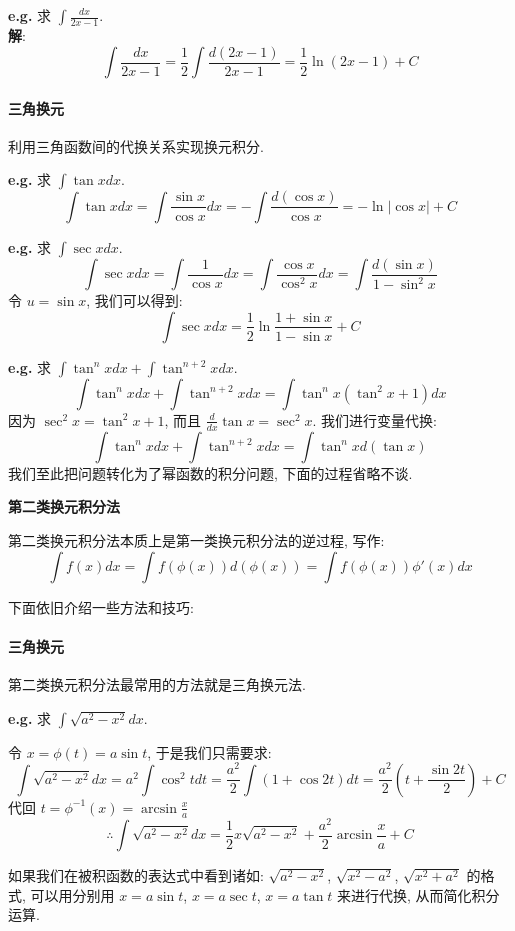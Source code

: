 \documentclass[a4paper,12pt]{ctexart}
\begin{document}
\noindent\textbf{e.g.} 求 $\int \frac{dx}{2x-1}$. \\
\textbf{解}:
$$
\int \frac{dx}{2x-1} = \frac{1}{2}\int \frac{d(2x-1)}{2x-1}=\frac{1}{2} \ln (2x-1) +C
$$

\paragraph{三角换元} 利用三角函数间的代换关系实现换元积分.

\noindent\textbf{e.g.} 求 $\int \tan x dx$.
$$
\int \tan x dx = \int \frac{\sin x}{\cos x} dx = -\int \frac{d(\cos x)}{\cos x} = -\ln |\cos x| + C
$$

\noindent\textbf{e.g.} 求 $\int \sec x dx$.
$$
\int \sec x dx = \int \frac{1}{\cos x} dx = \int \frac{\cos x}{\cos ^2 x} dx = \int \frac{d(\sin x)}{1-\sin^2 x}
$$
令 $u = \sin x$, 我们可以得到: 
$$
\int \sec x dx = \frac{1}{2} \ln \frac{1+\sin x}{1 - \sin x} +C
$$

\noindent\textbf{e.g.} 求 $\int \tan^nx dx +\int \tan^{n+2}x dx$.
$$
\int \tan^nx dx +\int \tan^{n+2}x dx = \int \tan^n x (\tan^2 x+1)dx
$$
因为 $\sec^2x = \tan^2x+1$, 而且 $\frac{d}{dx} \tan x = \sec^2 x$. 我们进行变量代换:
$$
\int \tan^nx dx +\int \tan^{n+2}x dx = \int \tan^n x d(\tan x)
$$
我们至此把问题转化为了幂函数的积分问题, 下面的过程省略不谈.

\textbf{第二类换元积分法}

第二类换元积分法本质上是第一类换元积分法的逆过程, 写作:
$$
\int f(x)dx = \int f(\phi (x))d(\phi (x)) = \int f(\phi (x))\phi'(x)dx
$$

下面依旧介绍一些方法和技巧: 

\paragraph{三角换元} 第二类换元积分法最常用的方法就是三角换元法.

\noindent\textbf{e.g.} 求 $\int \sqrt{a^2 - x^2}dx$.

令 $x = \phi (t) = a \sin t$, 于是我们只需要求:
$$
\int \sqrt{a^2 - x^2}dx =a^2 \int \cos^2 t dt= \frac{a^2}{2}\int (1+\cos 2t)dt = \frac{a^2}{2} (t + \frac{\sin 2t}{2}) +C
$$
代回 $t = \phi^{-1} (x) = \arcsin \frac{x}{a}$
$$
\therefore \int \sqrt{a^2 - x^2}dx = \frac{1}{2} x \sqrt{a^2 - x^2} + \frac{a^2}{2} \arcsin\frac{x}{a} +C
$$

如果我们在被积函数的表达式中看到诸如: $\sqrt{a^2 - x^2}$, $\sqrt{x^2-a^2}$, $\sqrt{x^2 + a^2}$ 的格式, 可以用分别用 $x = a\sin t$, $x = a \sec t$, $x = a \tan t$ 来进行代换, 从而简化积分运算.
\end{document}
